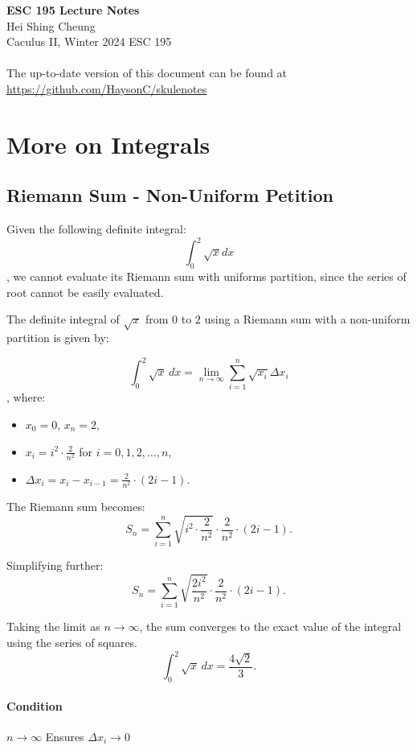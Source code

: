 \documentclass[11pt]{report}
\begin{document}
\thispagestyle{empty}
{\LARGE \bf ESC 195 Lecture Notes}\\
{\large Hei Shing Cheung}\\
Caculus II, Winter 2024 \hfill ESC 195\\
\\
The up-to-date version of this document can be found at \url{https://github.com/HaysonC/skulenotes}\\

\section{More on Integrals}
\subsection{Riemann Sum - Non-Uniform Petition}
\begin{example}
    Given the following definite integral:
    $$\int^2_0 \sqrt{x} dx$$, we cannot evaluate its Riemann sum with uniforms partition, since the series of root cannot be easily evaluated. 
\end{example}

The definite integral of $\sqrt{x}$ from $0$ to $2$ using a Riemann sum with a non-uniform partition is given by:

$$\int_{0}^{2} \sqrt{x} \, dx = \lim_{n \to \infty} \sum_{i=1}^n \sqrt{x_i} \Delta x_i$$
, where:
\begin{itemize}
    \item $x_0 = 0, \, x_n = 2$,
    \item $x_i = i^2 \cdot \frac{2}{n^2}$ for $i = 0, 1, 2, \dots, n$,
    \item $\Delta x_i = x_i - x_{i-1} = \frac{2}{n^2} \cdot (2i - 1)$.
\end{itemize}

The Riemann sum becomes:
$$
S_n = \sum_{i=1}^n \sqrt{i^2 \cdot \frac{2}{n^2}} \cdot \frac{2}{n^2} \cdot (2i - 1).
$$

Simplifying further:
$$
S_n = \sum_{i=1}^n \sqrt{\frac{2i^2}{n^2}} \cdot \frac{2}{n^2} \cdot (2i - 1).
$$

Taking the limit as $n \to \infty$, the sum converges to the exact value of the integral using the series of squares. 
$$
\int_{0}^{2} \sqrt{x} \, dx = \frac{4\sqrt{2}}{3}.
$$
\paragraph{Condition} $n \to \infty$ Ensures $\Delta x_i \to 0$
\end{document}
